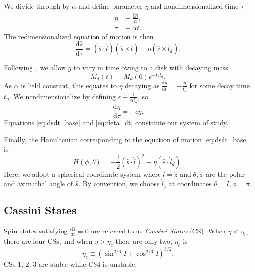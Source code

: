 \documentclass[
        fleqn,
        usenatbib,
    ]{mnras}
\newcommand*{\rd}[2]{\frac{\mathrm{d}#1}{\mathrm{d}#2}}
\newcommand*{\abs}[1]{\left|#1\right|}
\newcommand*{\p}[1]{\left(#1\right)}
\begin{document}
We divide through by $\alpha$ and define parameter $\eta$ and nondimensionalized
time $\tau$
\begin{align}
    \eta &\equiv \frac{\abs{g}}{\alpha}\label{eq:eta},\\
    \tau &\equiv \alpha t.
\end{align}
The redimensionalized equation of motion is then
\begin{equation}
    \rd{\hat{s}}{\tau} = \p{\hat{s} \cdot \hat{l}}
            \p{\hat{s} \times \hat{l}}
        - \eta\p{\hat{s} \times \hat{l}_d}. \label{eq:dsdt_base}
\end{equation}

Following~\cite{millholland_disk}, we allow $g$ to vary in time owing to a
disk with decaying mass
\begin{equation}
    M_d(t) = M_d(0)e^{-t/t_d}.
\end{equation}
As $\alpha$ is held constant, this equates to $\eta$ decaying as $\rd{\eta}{t} =
-\frac{\eta}{t_d}$ for some decay time $t_\eta$. We nondimensionalize by
defining $\epsilon \equiv \frac{1}{\alpha t_\eta}$, so
\begin{equation}
    \rd{\eta}{\tau} = -\epsilon \eta.\label{eq:deta_dt}
\end{equation}
Equations \autoref{eq:dsdt_base} and \autoref{eq:deta_dt} constitute our system
of study.

Finally, the Hamiltonian corresponding to the equation of motion
\autoref{eq:dsdt_base} is
\begin{equation}
    H\p{\phi, \theta} = -\frac{1}{2}\p{\hat{s} \cdot \hat{l}}^2
        + \eta \p{\hat{s} \cdot \hat{l}_d}.\label{eq:H}
\end{equation}
Here, we adopt a spherical coordinate system where $\hat{l} = \hat{z}$ and
$\theta, \phi$ are the polar and azimuthal angle of $\hat{s}$. By convention, we
choose $\hat{l}_z$ at coordinates $\theta = I, \phi = \pi$.

\subsection{Cassini States}\label{ss:cs}

Spin states satisfying $\rd{\hat{s}}{t} = 0$ are referred to as \emph{Cassini
States} (CS). When $\eta < \eta_c$, there are four CSs, and when $\eta > \eta_c$
there are only two; $\eta_c$ is \citep{henrard1987,ward2004I}
\begin{equation}
    \eta_c \equiv \p{\sin^{2/3}I + \cos^{2/3}I}^{3/2}.
\end{equation}
CSs 1, 2, 3 are stable while CS4 is unstable.
\end{document}
